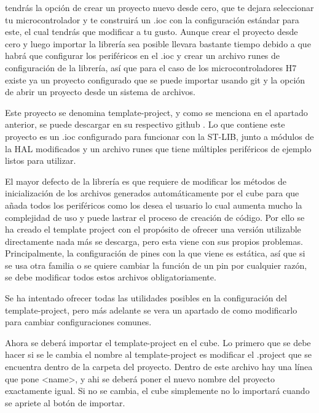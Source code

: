 \documentclass{report}
\begin{document}
tendrás la opción de crear un proyecto nuevo desde cero, que te dejara seleccionar tu microcontrolador y te construirá un .ioc con la configuración estándar para este, el cual tendrás que modificar a tu gusto. Aunque crear el proyecto desde cero y luego importar la librería sea posible llevara bastante tiempo debido a que habrá que configurar los periféricos en el .ioc y crear un archivo runes de configuración de la librería, así que para el caso de los microcontroladores H7 existe ya un proyecto configurado que se puede importar usando git y la opción de abrir un proyecto desde un sistema de archivos. \par \vspace{0.3 cm}

Este proyecto se denomina template-project, y como se menciona en el apartado anterior, se puede descargar en su respectivo github \cite{web:github:templateproject}. Lo que contiene este proyecto es un .ioc configurado para funcionar con la ST-LIB, junto a módulos de la HAL modificados y un archivo runes que tiene múltiples periféricos de ejemplo listos para utilizar. \par
El mayor defecto de la librería es que requiere de modificar los métodos de inicialización de los archivos generados automáticamente por el cube para que añada todos los periféricos como los desea el usuario lo cual aumenta mucho la complejidad de uso y puede lastrar el proceso de creación de código. Por ello se ha creado el template project con el propósito de ofrecer una versión utilizable directamente nada más se descarga, pero esta viene con sus propios problemas. Principalmente, la configuración de pines con la que viene es estática, así que si se usa otra familia o se quiere cambiar la función de un pin por cualquier razón, se debe modificar todos estos archivos obligatoriamente. \par
Se ha intentado ofrecer todas las utilidades posibles en la configuración del template-project, pero más adelante se vera un apartado de como modificarlo para cambiar configuraciones comunes. \par \vspace{0.3 cm}

Ahora se deberá importar el template-project en el cube. Lo primero que se debe hacer si se le cambia el nombre al template-project es modificar el .project que se encuentra dentro de la carpeta del proyecto. Dentro de este archivo hay una línea que pone <name>, y ahi se deberá poner el nuevo nombre del proyecto exactamente igual. Si no se cambia, el cube simplemente no lo importará cuando se apriete al botón de importar. \par \vspace{0.3 cm}
\end{document}
